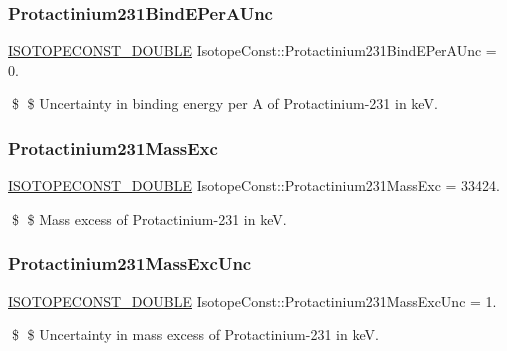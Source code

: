 \subsubsection{\texorpdfstring{Protactinium231\+Bind\+E\+Per\+A\+Unc}{Protactinium231BindEPerAUnc}}
{\footnotesize\ttfamily \mbox{\hyperlink{group___isotope_const-_macros_ga8f45a7272ce02c0b4c65c44636ed719a}{I\+S\+O\+T\+O\+P\+E\+C\+O\+N\+S\+T\+\_\+\+D\+O\+U\+B\+LE}} Isotope\+Const\+::\+Protactinium231\+Bind\+E\+Per\+A\+Unc = 0.}

\$ \$ Uncertainty in binding energy per A of Protactinium-\/231 in keV. \mbox{\label{group___isotope_const-_protactinium-_pa231_ga9cbb78d0da282cc01e2c5a9133d489d8}} 
\subsubsection{\texorpdfstring{Protactinium231\+Mass\+Exc}{Protactinium231MassExc}}
{\footnotesize\ttfamily \mbox{\hyperlink{group___isotope_const-_macros_ga8f45a7272ce02c0b4c65c44636ed719a}{I\+S\+O\+T\+O\+P\+E\+C\+O\+N\+S\+T\+\_\+\+D\+O\+U\+B\+LE}} Isotope\+Const\+::\+Protactinium231\+Mass\+Exc = 33424.}

\$ \$ Mass excess of Protactinium-\/231 in keV. \mbox{\label{group___isotope_const-_protactinium-_pa231_ga5224a6b6a43b9b9b859d98d9aef4a3d3}} 
\subsubsection{\texorpdfstring{Protactinium231\+Mass\+Exc\+Unc}{Protactinium231MassExcUnc}}
{\footnotesize\ttfamily \mbox{\hyperlink{group___isotope_const-_macros_ga8f45a7272ce02c0b4c65c44636ed719a}{I\+S\+O\+T\+O\+P\+E\+C\+O\+N\+S\+T\+\_\+\+D\+O\+U\+B\+LE}} Isotope\+Const\+::\+Protactinium231\+Mass\+Exc\+Unc = 1.}

\$ \$ Uncertainty in mass excess of Protactinium-\/231 in keV. \mbox{\label{group___isotope_const-_protactinium-_pa231_gaaad513bf528147f4447fd2fd3356a6b8}} 
